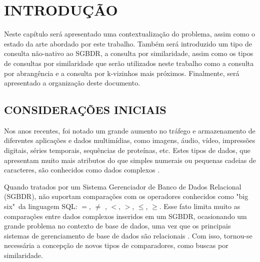 

\chapter{INTRODUÇÃO}
\label{chap:introducao}

Neste capítulo será apresentado uma contextualização do problema, assim como o estado da arte abordado por este trabalho.
Também será introduzido um tipo de consulta não-nativo ao SGBDR, a consulta por similaridade, assim como os tipos de consultas por similaridade
que serão utilizados neste trabalho como a consulta por abrangência e a consulta por k-vizinhos mais próximos. Finalmente, será apresentado a
organização deste documento.

\section{CONSIDERAÇÕES INICIAIS}
\label{sec:considini}

Nos anos recentes, foi notado um grande aumento no tráfego e armazenamento de diferentes aplicações e dados multimídias, como imagens, áudio, vídeo, impressões digitais, séries temporais,
sequências de proteínas, etc. Estes tipos de dados, que apresentam muito mais atributos do que simples numerais ou pequenas cadeias de caracteres, são conhecidos como dados complexos \cite{Zighed2008}.\par
Quando tratados por um Sistema Gerenciador de Banco de Dados Relacional (SGBDR), não suportam comparações com os operadores conhecidos como "big six"\ da linguagem SQL: $=$, $\neq$ , $<$, $>$, $\leq$, $\geq$.
Esse fato limita muito as comparações entre dados complexos inseridos em um SGBDR, ocasionando um grande problema no contexto de base de dados, uma vez que os principais sistemas de gerenciamento
de base de dados são relacionais \cite{DBE2017}. Com isso, tornou-se necessária a concepção de novos tipos de comparadores, como buscas por similaridade.\par 


